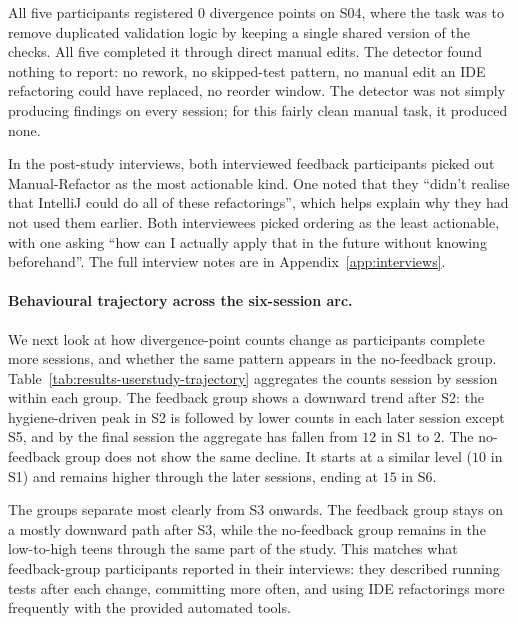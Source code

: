 All five participants registered $0$ divergence points on S04, where the task was to remove duplicated validation logic by keeping a single shared version of the checks. All five completed it through direct manual edits. The detector found nothing to report: no rework, no skipped-test pattern, no manual edit an IDE refactoring could have replaced, no reorder window. The detector was not simply producing findings on every session; for this fairly clean manual task, it produced none.

In the post-study interviews, both interviewed feedback participants picked out Manual-Refactor as the most actionable kind. One noted that they ``didn't realise that IntelliJ could do all of these refactorings'', which helps explain why they had not used them earlier. Both interviewees picked ordering as the least actionable, with one asking ``how can I actually apply that in the future without knowing beforehand''. The full interview notes are in Appendix~\ref{app:interviews}.

\paragraph{Behavioural trajectory across the six-session arc.}
We next look at how divergence-point counts change as participants complete more sessions, and whether the same pattern appears in the no-feedback group. Table~\ref{tab:results-userstudy-trajectory} aggregates the counts session by session within each group. The feedback group shows a downward trend after S2: the hygiene-driven peak in S2 is followed by lower counts in each later session except S5, and by the final session the aggregate has fallen from $12$ in S1 to $2$. The no-feedback group does not show the same decline. It starts at a similar level ($10$ in S1) and remains higher through the later sessions, ending at $15$ in S6.

The groups separate most clearly from S3 onwards. The feedback group stays on a mostly downward path after S3, while the no-feedback group remains in the low-to-high teens through the same part of the study. This matches what feedback-group participants reported in their interviews: they described running tests after each change, committing more often, and using IDE refactorings more frequently with the provided automated tools.


